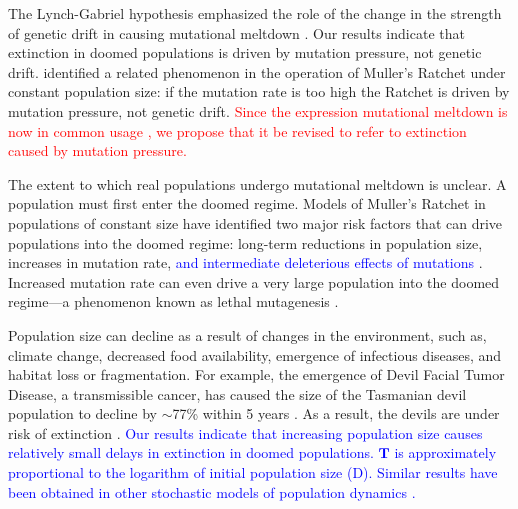 \documentclass[9pt,lineno]{elife}
\newcommand{\blue}{\textcolor{blue}}
\newcommand{\red}{\textcolor{red}}
\begin{document}
The Lynch-Gabriel hypothesis emphasized the role of the change in the strength of genetic drift in causing mutational meltdown \citep[e.g., ``we refer to this synergism between mutation accumulation and random genetic drift as a mutational meltdown'';][]{lyn93}.  
Our results indicate that extinction in doomed populations is driven by mutation pressure, not genetic drift.  
%
\citet{Gessler_The_1995}  identified a related phenomenon in the operation of Muller's Ratchet under constant population size: if the mutation rate is too high the Ratchet is driven by mutation pressure, not genetic drift.
%
\red{Since the expression mutational meltdown is now in common usage \citep[e.g.,][]{row03, Allen_Mutational_2009, McFarland_Tug_2014}, we propose that it be revised to refer to extinction caused by mutation pressure.}

The extent to which real populations undergo mutational meltdown is unclear.  A population must first enter the doomed regime.  Models of Muller's Ratchet in populations of constant size
have identified two major risk factors that can drive populations into the doomed regime: long-term reductions in population size,  increases in mutation rate, 
\blue{and intermediate deleterious effects of mutations}
\citep{Lynch_MUTATION_1990, lyn93, Gabriel_MULLER_1993, lyn95, McFarland_Impact_2013}.  Increased mutation rate can even drive a very large population into the doomed regime---a phenomenon known as lethal mutagenesis \citep{Bull_Theory_2007}.

Population size can decline as a result of changes in the environment, such as, climate change, decreased food availability, emergence of infectious diseases, and habitat loss or fragmentation.  
For example, the emergence of Devil Facial Tumor Disease, a transmissible cancer, has caused the size of the Tasmanian devil population to decline by $\sim$77\% within 5 years \citep{haw06, laz18}.  As a result, the devils are under risk of extinction \citep{mcc09}. 
%
\blue{Our results indicate that increasing population size causes relatively small delays in extinction in doomed populations.  
%
$\mathbf{T}$ is approximately proportional to the logarithm of initial population size (D).  
%
Similar results have been obtained in other stochastic models of population dynamics \citep{lan93, Jagers_On_2007}.}
\end{document}
